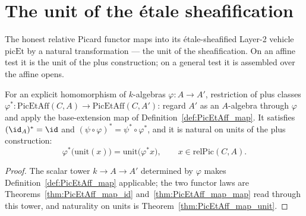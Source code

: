 \section{The unit of the \'etale sheafification}
\label{sec:picEtUnit}

The honest relative Picard functor maps into its \'etale-sheafified Layer-2 vehicle
\(\mathrm{picEt}\) by a natural transformation — the unit of the sheafification. On an affine
test it is the unit of the plus construction; on a general test it is assembled over the
affine opens.

\begin{definition}
  \label{def:PicEtAff_mapAlg}
  \leanok
  For an explicit homomorphism of \(k\)-algebras \(\varphi \colon A \to A'\), restriction of
  plus classes \(\varphi^{*} \colon \mathrm{PicEtAff}(C,A) \to \mathrm{PicEtAff}(C,A')\):
  regard \(A'\) as an \(A\)-algebra through \(\varphi\) and apply the base-extension map of
  Definition~\ref{def:PicEtAff_map}. It satisfies \((\id_A)^{*} = \id\) and
  \((\psi \circ \varphi)^{*} = \psi^{*} \circ \varphi^{*}\), and it is natural on units of
  the plus construction:
  \[
    \varphi^{*}\bigl(\mathrm{unit}(x)\bigr) = \mathrm{unit}\bigl(\varphi^{*} x\bigr),
    \qquad x \in \mathrm{relPic}(C,A).
  \]
\end{definition}
\begin{proof}
  \leanok
  The scalar tower \(k \to A \to A'\) determined by \(\varphi\) makes
  Definition~\ref{def:PicEtAff_map} applicable; the two functor laws are
  Theorems~\ref{thm:PicEtAff_map_id} and~\ref{thm:PicEtAff_map_map} read through this tower,
  and naturality on units is Theorem~\ref{thm:PicEtAff_map_unit}.
\end{proof}

